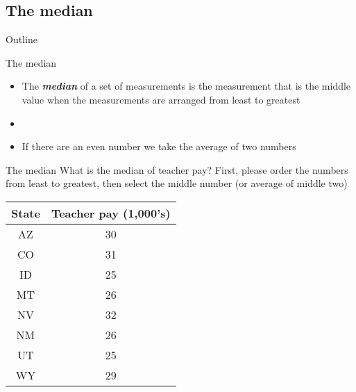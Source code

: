 \documentclass[xcolor=dvipsnames]{beamer}
\begin{document}
\subsection{The median}
\begin{frame}{Outline}
	\tableofcontents[currentsection,subsectionstyle=show/shaded/hide]
\end{frame}

\begin{frame}{The median}
	\begin{itemize}
		\item The \emph{\textbf{median}} of a set of measurements is the measurement that is the middle value when the measurements are arranged from least to greatest \pause
		\item[]
		\item If there are an even number we take the average of two numbers
	\end{itemize}
\end{frame}

\begin{frame}{The median}
	What is the median of teacher pay? First, please order the numbers from least to greatest, then select the middle number (or average of middle two)
	\begin{center}
		\begin{tabular}{|c|c|}
			\hline 
			\textbf{State} & \textbf{Teacher pay (1,000's)} \\ 
			\hline \hline
			AZ & 30 \\ \hline 
			CO &  31 \\ \hline 
			ID & 25  \\  \hline 
			MT &  26 \\ \hline 
			NV & 32 \\ \hline 
			NM &  26 \\ \hline 
			UT &  25 \\ \hline 
			WY &  29 \\ \hline 
		\end{tabular} 
	\end{center}
\end{frame}
\end{document}
